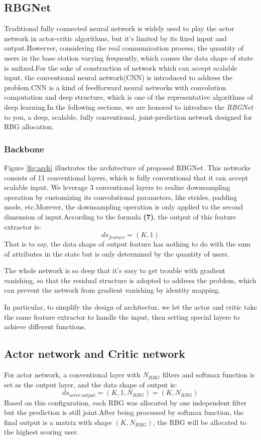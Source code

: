 \documentclass[conference,compsocconf]{IEEEtran}
\begin{document}
\subsection{RBGNet}
Traditional fully connected neural network is widely used to play the actor network in actor-critic algorithms, but it's limited by its fixed input and output.Howerver, considering the real communication process, the quantity of users in the base station varying frequently, which causes the data shape of state is unfixed.For the sake of construction of network which can accept scalable input, the conventional neural network(CNN) is introduced to address the problem.CNN is a kind of feedforward neural networks with convolution computation and deep structure, which is one of the representative algorithms of deep learning.In the following sections, we are honored to introduce the \textit{RBGNet} to you, a deep, scalable, fully conventional, joint-prediction network designed for RBG allocation.

\subsubsection{Backbone}
Figure \ref{fig:arch} illustrates the architecture of proposed RBGNet. This networks consists of 11 conventional layers, which is fully conventional that it can accept scalable input.\cite{long2015fully} We leverage 3 conventional layers to realize downsampling operation by customizing its convolutional parameters, like strides, padding mode, etc.Morever, the downsampling operation is only applied to the second dimension of input.According to the formula \textbf{(7)}, the output of this feature extractor is:
\begin{equation}
	ds_{feature} = (K, 1)
\end{equation}
That is to say, the data shape of output feature has nothing to do with the sum of attributes in the state but is only determined by the quantity of users.

The whole network is so deep that it's easy to get trouble with gradient vanishing, so that the residual structure is adopted to address the problem, which can prevent the network from gradient vanishing by identity mapping.\cite{He2016Deep}

In particular, to simplify the design of architectur, we let the actor and critic take the same feature extractor to handle the input, then setting special layers to achieve different functions.

\subsection{Actor network and Critic network}
For actor network, a conventional layer with $N_{RBG}$ filters and softmax function is set as the output layer, and the data shape of output is:
\begin{equation}
	ds_{actor \, output} = (K, 1, N_{RBG}) = (K, N_{RBG})
\end{equation}
Based on this configuration, each RBG was allocated by one independent filter but the prediction is still joint.After being processed by softmax function, the final output is a matrix with shape $(K, N_{RBG})$, the RBG will be allocated to the highest scoring user.
\end{document}
